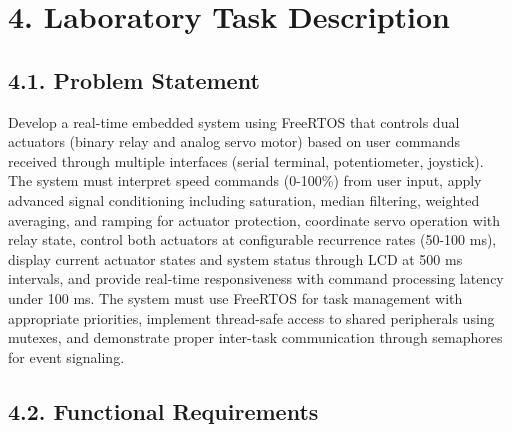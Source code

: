 \documentclass[12pt]{article}
\begin{document}
\section*{4. Laboratory Task Description}

\subsection*{4.1. Problem Statement}

Develop a real-time embedded system using FreeRTOS that controls dual actuators (binary relay and analog servo motor) based on user commands received through multiple interfaces (serial terminal, potentiometer, joystick). The system must interpret speed commands (0-100\%) from user input, apply advanced signal conditioning including saturation, median filtering, weighted averaging, and ramping for actuator protection, coordinate servo operation with relay state, control both actuators at configurable recurrence rates (50-100 ms), display current actuator states and system status through LCD at 500 ms intervals, and provide real-time responsiveness with command processing latency under 100 ms. The system must use FreeRTOS for task management with appropriate priorities, implement thread-safe access to shared peripherals using mutexes, and demonstrate proper inter-task communication through semaphores for event signaling.

\subsection*{4.2. Functional Requirements}
\end{document}
